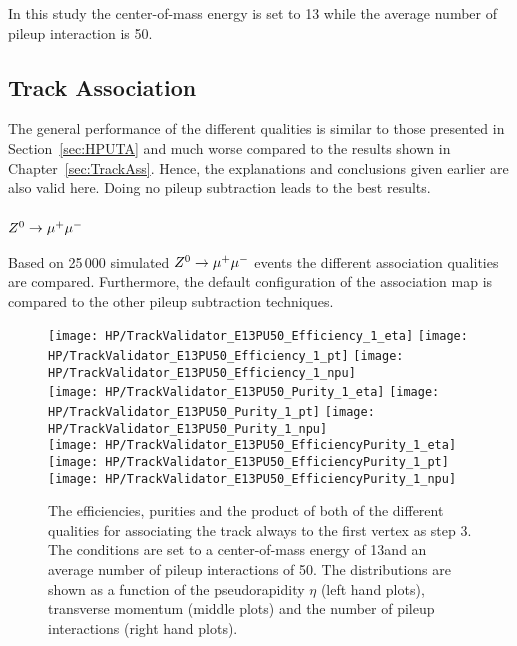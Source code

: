 In this study the center-of-mass energy is set to 13\TeV{} while the average number of pileup interaction is 50. 

\subsection{Track Association \label{sec:HPUAppE13PU50TA}}

The general performance of the different qualities is similar to those presented in Section~\ref{sec:HPUTA} and much worse compared to the results shown in Chapter~\ref{sec:TrackAss}. Hence, the explanations and conclusions given earlier are also valid here. Doing no pileup subtraction leads to the best results.

\subsubsection{${Z^{0}}\rightarrow\mu^+\mu^-$}

Based on 25\,000 simulated ${Z^{0}}\rightarrow\mu^+\mu^-$ events the different association qualities are compared. Furthermore, the default configuration of the association map is compared to the other pileup subtraction techniques.

\begin{figure}[!h]
  \centering
  \texttt{[image: HP/TrackValidator\_E13PU50\_Efficiency\_1\_eta]}
  \texttt{[image: HP/TrackValidator\_E13PU50\_Efficiency\_1\_pt]}
  \texttt{[image: HP/TrackValidator\_E13PU50\_Efficiency\_1\_npu]}
   \\
  \texttt{[image: HP/TrackValidator\_E13PU50\_Purity\_1\_eta]}
  \texttt{[image: HP/TrackValidator\_E13PU50\_Purity\_1\_pt]}
  \texttt{[image: HP/TrackValidator\_E13PU50\_Purity\_1\_npu]}
   \\
  \texttt{[image: HP/TrackValidator\_E13PU50\_EfficiencyPurity\_1\_eta]}
  \texttt{[image: HP/TrackValidator\_E13PU50\_EfficiencyPurity\_1\_pt]}
  \texttt{[image: HP/TrackValidator\_E13PU50\_EfficiencyPurity\_1\_npu]}
  \caption[Efficiencies, purities and their product of the different qualities of the association map with associating the track always to the first vertex during step 3 with 13\TeV and PU=50]{The efficiencies, purities and the product of both of the different qualities for associating the track always to the first vertex as step 3. The conditions are set to a center-of-mass energy of 13\TeV and an average number of pileup interactions of 50. The distributions are shown as a function of the pseudorapidity $\eta$ (left hand plots), transverse momentum (middle plots) and the number of pileup interactions (right hand plots).}
\end{figure}
\clearpage

